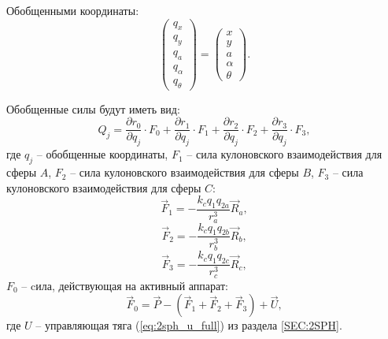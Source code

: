 Обобщенными координаты:
\begin{equation}
\label{eq:2sph_msm_qj}
	\begin{pmatrix}
		q_x \\
		q_y \\
		q_a \\
		q_\alpha \\
		q_\theta
	\end{pmatrix} 
	=
	\begin{pmatrix}
		x \\
		y \\
		a \\
		\alpha \\
		\theta
	\end{pmatrix}.
\end{equation}

Обобщенные силы будут иметь вид:
\begin{equation}
\label{eq:2sph_msm_Q}
	Q_j = \frac{\partial r_0}{\partial q_j} \cdot F_0 + \frac{\partial r_1}{\partial q_j} \cdot F_1 +\frac{\partial r_2}{\partial q_j} \cdot F_2 +\frac{\partial r_3}{\partial q_j} \cdot F_3,
\end{equation}
где $q_j$ – обобщенные координаты, $F_1$ – сила кулоновского взаимодействия для сферы $A$, $F_2$ – сила кулоновского взаимодействия для сферы $B$, $F_3$ – сила кулоновского взаимодействия для сферы $C$:
\begin{equation}
\label{eq:2sph_msm_f1}
	\vec{F}_1 = -\frac{k_c q_1 q_{2a}}{r_a^3}\vec{R}_a,
\end{equation}
\begin{equation}
\label{eq:2sph_msm_f2}
	\vec{F}_2 = -\frac{k_c q_1 q_{2b}}{r_b^3}\vec{R}_b,
\end{equation}
\begin{equation}
\label{eq:2sph_msm_f3}
	\vec{F}_3 = -\frac{k_c q_1 q_{2c}}{r_c^3}\vec{R}_c,
\end{equation}
$F_0$ – cила, действующая на активный аппарат:
\begin{equation}
\label{eq:2sph_msm_f0_u}
	\vec{F}_0 = \vec{P} - (\vec{F}_1 + \vec{F}_2 + \vec{F}_3) + \vec{U},
\end{equation}
где $U$ – управляющая тяга (\ref{eq:2sph_u_full}) из раздела \ref{SEC:2SPH}.

